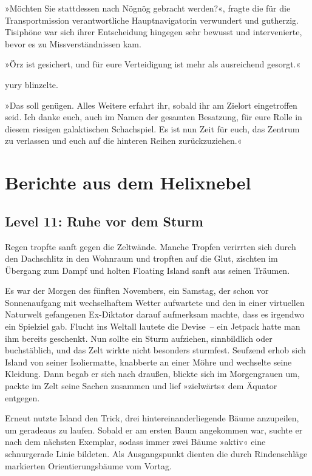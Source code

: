 »Möchten Sie stattdessen nach Nögnög gebracht werden?«, fragte die für die Transportmission verantwortliche Hauptnavigatorin verwundert und gutherzig. Tisiphöne war sich ihrer Entscheidung hingegen sehr bewusst und intervenierte, bevor es zu Missverständnissen kam.

»Örz ist gesichert, und für eure Verteidigung ist mehr als ausreichend gesorgt.«

yury blinzelte.

»Das soll genügen. Alles Weitere erfahrt ihr, sobald ihr am Zielort eingetroffen seid. Ich danke euch, auch im Namen der gesamten Besatzung, für eure Rolle in diesem riesigen galaktischen Schachspiel. Es ist nun Zeit für euch, das Zentrum zu verlassen und euch auf die hinteren Reihen zurückzuziehen.«

\cleardoubleevenpage



\chapter{Berichte aus dem Helixnebel}

\section{Level 11: Ruhe vor dem Sturm}

Regen tropfte sanft gegen die Zeltwände. Manche Tropfen verirrten sich durch den Dachschlitz in den Wohnraum und tropften auf die Glut, zischten im Übergang zum Dampf und holten Floating Island sanft aus seinen Träumen.

Es war der Morgen des fünften Novembers, ein Samstag, der schon vor Sonnenaufgang mit wechselhaftem Wetter aufwartete und den in einer virtuellen Naturwelt gefangenen Ex-Diktator darauf aufmerksam machte, dass es irgendwo ein Spielziel gab. Flucht ins Weltall lautete die Devise~– ein Jetpack hatte man ihm bereits geschenkt. Nun sollte ein Sturm aufziehen, sinnbildlich oder buchstäblich, und das Zelt wirkte nicht besonders sturmfest. Seufzend erhob sich Island von seiner Isoliermatte, knabberte an einer Möhre und wechselte seine Kleidung. Dann begab er sich nach draußen, blickte sich im Morgengrauen um, packte im Zelt seine Sachen zusammen und lief »zielwärts« dem Äquator entgegen.

Erneut nutzte Island den Trick, drei hintereinanderliegende Bäume anzupeilen, um geradeaus zu laufen. Sobald er am ersten Baum angekommen war, suchte er nach dem nächsten Exemplar, sodass immer zwei Bäume »aktiv« eine schnurgerade Linie bildeten. Als Ausgangspunkt dienten die durch Rindenschläge markierten Orientierungsbäume vom Vortag.

